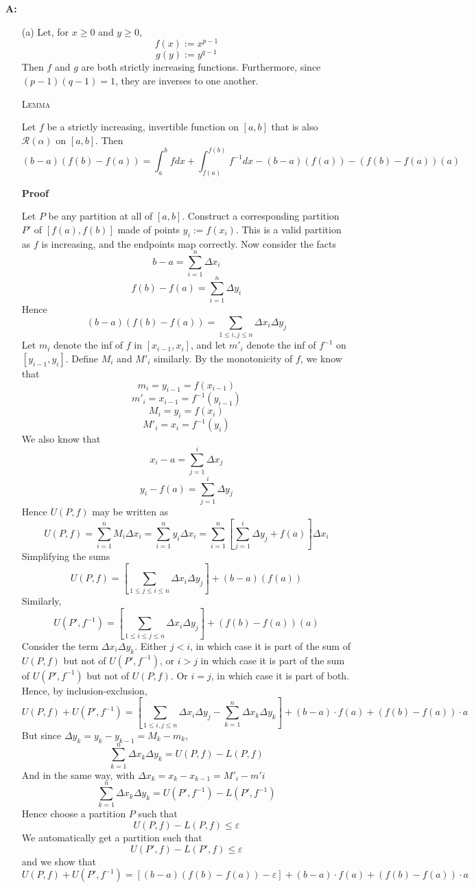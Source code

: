\documentclass{article}
\newenvironment{Answer} {\par\noindent\textbf{A:}} {}
\begin{document}
\begin{Answer}
    \begin{itemize}
        \item[(a)]
            Let, for $x \geq 0$ and $y \geq 0$,
            \[f(x) := x^{p-1}\]
            \[g(y) := y^{q-1}\]
            Then $f$ and $g$ are both strictly increasing functions. Furthermore, since $(p-1)(q-1) = 1$, they are inverses to one another.

        \textsc{Lemma}
        
        Let $f$ be a strictly increasing, invertible function on $[a, b]$ that is also $\mathscr{R}(\alpha)$ on $[a ,b]$. Then
        \[(b-a)(f(b)-f(a)) = \int_a^b f dx + \int_{f(a)}^{f(b)}f^{-1} dx - (b-a)(f(a)) - (f(b)-f(a))(a)\]

        \textbf{Proof}

        Let $P$ be any partition at all of $[a, b]$. Construct a corresponding partition $P'$ of $[f(a), f(b)]$ made of points $y_i := f(x_i)$. This is a valid partition as $f$ is increasing, and the endpoints map correctly. 
        Now consider the facts 
        \[b-a = \sum_{i=1}^n \Delta x_i\]
        \[f(b)-f(a) = \sum_{i=1}^n \Delta y_i\]
        Hence 
        \[(b-a)(f(b)-f(a)) = \sum_{1 \leq i , j \leq n} \Delta x_i \Delta y_j\]
        Let $m_i$ denote the inf of $f$ in $[x_{i-1}, x_i]$, and let $m'_i$ denote the inf of $f^{-1}$ on $[y_{i-1}, y_i]$. Define $M_i$ and $M'_i$ similarly.
        By the monotonicity of $f$, we know that 
        \[m_i = y_{i-1} = f(x_{i-1})\]
        \[m'_i = x_{i-1} = f^{-1}(y_{i-1})\]
        \[M_i = y_i = f(x_i)\]
        \[M'_i = x_i = f^{-1}(y_i)\]
        We also know that
        \[x_i - a = \sum_{j=1}^i \Delta x_j\]
        \[y_i - f(a) = \sum_{j=1}^i \Delta y_j\]
        Hence $U(P, f)$ may be written as
        \[U(P, f) = \sum_{i=1}^n M_i \Delta x_i = \sum_{i=1}^n y_i \Delta x_i = \sum_{i=1}^n \left[\sum_{j=1}^i \Delta y_j + f(a)\right] \Delta x_i\]
        Simplifying the sums
        \[U(P, f) = \left[\sum_{1 \leq j \leq i \leq n} \Delta x_i \Delta y_j \right] + (b-a)(f(a))\]
    Similarly,
    \[U(P', f^{-1}) = \left[\sum_{1 \leq i \leq j \leq n} \Delta x_i \Delta y_j \right] + (f(b)-f(a))(a)\]
    Consider the term $\Delta x_i \Delta y_k$. Either $j < i$, in which case it is part of the sum of $U(P, f)$ but not of $U(P', f^{-1})$, or $i > j$ in which case it is part of the sum of $U(P',f^{-1})$ but not of $U(P, f)$. Or $i = j$, in which case it is part of both.
    Hence, by inclusion-exclusion,
\[U(P, f) + U(P', f^{-1}) = \left[ \sum_{1 \leq i , j \leq n} \Delta x_i \Delta y_j - \sum_{k=1}^n \Delta x_k \Delta y_k \right] + (b-a)\cdot f(a) + (f(b)-f(a))\cdot a\]
    But since $\Delta y_k = y_k - y_{k-1} = M_k - m_k$, 
    \[\sum_{k=1}^n \Delta x_k \Delta y_k = U(P, f) - L(P,f)\]
    And in the same way, with $\Delta x_k = x_k - x_{k-1} = M'_i - m'i$
    \[\sum_{k=1}^n \Delta x_k \Delta y_k = U(P', f^{-1}) - L(P',f^{-1})\]
    Hence choose a partition $P$ such that 
    \[U(P, f) - L(P,f) \leq \varepsilon\]
    We automatically get a partition such that
    \[U(P', f) - L(P',f) \leq \varepsilon\]
    and we show that
\[U(P, f) + U(P', f^{-1}) = \left[ (b-a)(f(b)-f(a)) - \varepsilon \right] + (b-a)\cdot f(a) + (f(b)-f(a))\cdot a\]


\end{itemize}
\end{Answer}
\end{document}
